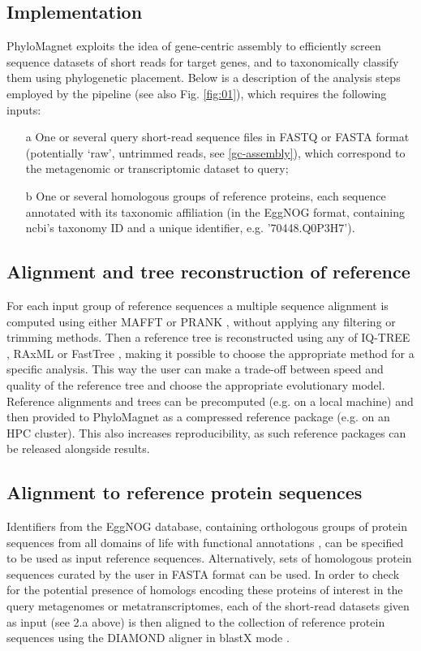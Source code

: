\documentclass{bioinfo}
\begin{document}
\begin{methods}
\section{Implementation}
PhyloMagnet exploits the idea of gene-centric assembly \citep{Huson2017} to efficiently screen sequence datasets  of short reads for target genes, and to taxonomically classify them using phylogenetic placement. Below is a description of the analysis steps employed by the pipeline (see also Fig. \ref{fig:01}), which requires the following inputs: 
\begin{enumerate}

\item[a] One or several query short-read sequence files in FASTQ or FASTA format (potentially ‘raw’, untrimmed reads, see \ref{gc-assembly}), which correspond to the metagenomic or transcriptomic dataset to query;
\item[b] One or several homologous groups of reference proteins, each sequence annotated with its taxonomic affiliation (in the EggNOG format, containing ncbi’s taxonomy ID and a unique identifier, e.g. '70448.Q0P3H7').
\end{enumerate}

\subsection{Alignment and tree reconstruction of reference}
For each input group of reference sequences a multiple sequence alignment is computed using either MAFFT \citep{Katoh2013} or PRANK \citep{Loytynoja2010}, without applying any filtering or trimming methods. Then a reference tree is reconstructed using any of IQ-TREE \citep{Nguyen2015}, RAxML \citep{Stamatakis2014} or FastTree \citep{Price2010}, making it possible to choose the appropriate method for a specific analysis. This way the user can make a trade-off between speed and quality of the reference tree and choose the appropriate evolutionary model. Reference alignments and trees can be precomputed (e.g. on a local machine) and then provided to PhyloMagnet as a compressed reference package (e.g. on an HPC cluster). This also increases reproducibility, as such reference packages can be released alongside results.

\subsection{Alignment to reference protein sequences}
Identifiers from the EggNOG database, containing orthologous groups of protein sequences from all domains of life with functional annotations \citep{Huerta-cepas2016b}, can be specified to be used as input reference sequences. Alternatively, sets of homologous protein sequences curated by the user in FASTA format can be used. In order to check for the potential presence of homologs encoding these proteins of interest in the query metagenomes or metatranscriptomes, each of the short-read datasets given as input (see 2.a above) is then aligned to the collection of reference protein sequences using the DIAMOND aligner in blastX mode \citep{Buchfink2014}.


\end{methods}
\end{document}

